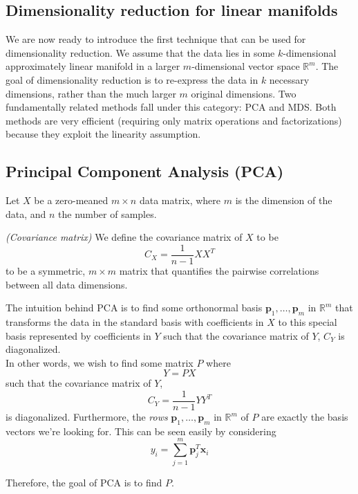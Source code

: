\documentclass[11pt]{article}
\newenvironment{definition}[1][Definition]{\begin{trivlist}
\item[\hskip \labelsep {\bfseries #1}]}{\end{trivlist}}
\begin{document}
\begin{multicols}{2}
\section*{Dimensionality reduction for linear manifolds}

We are now ready to introduce the first technique that can be used for dimensionality reduction. We assume that the data lies in some $k$-dimensional approximately linear manifold in a larger $m$-dimensional vector space $\mathbb{R}^m$. The goal of dimensionality reduction is to re-express the data in $k$ necessary dimensions, rather than the much larger $m$ original dimensions. Two fundamentally related methods fall under this category: PCA and MDS. Both methods are very efficient (requiring only matrix operations and factorizations) because they exploit the linearity assumption.

\subsection*{Principal Component Analysis (PCA)}

Let $X$ be a zero-meaned $m \times n$ data matrix, where $m$ is the dimension of the data, and $n$ the number of samples.

\begin{definition}
\emph{(Covariance matrix)}
\label{Cov}
We define the covariance matrix of $X$ to be
\[C_X = \frac{1}{n-1} XX^T\]
 to be a symmetric, $m \times m$ matrix that quantifies the pairwise correlations between all data dimensions.
\end{definition}

The intuition behind PCA is to find some orthonormal basis $\mathbf{p}_1, \ldots, \mathbf{p}_m$ in $\mathbb{R}^m$ that transforms the data in the standard basis with coefficients in $X$ to this special basis represented by coefficients in $Y$ such that the covariance matrix of $Y$, $C_Y$ is diagonalized. \\

In other words, we wish to find some matrix $P$ where
\[Y = PX\]
such that the covariance matrix of $Y$,
\[C_Y = \frac{1}{n-1} YY^T\]
is diagonalized. Furthermore, the \textit{rows} $\mathbf{p}_1, \ldots, \mathbf{p}_m$ in $\mathbb{R}^m$ of $P$ are exactly the basis vectors we're looking for. This can be seen easily by considering
\[y_i = \sum_{j=1}^m \mathbf{p}_j^T \mathbf{x}_i \]

Therefore, the goal of PCA is to find $P$. \\


\end{multicols}
\end{document}
